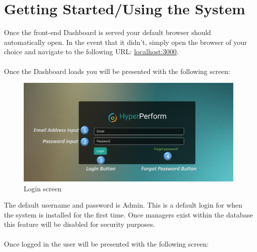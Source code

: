 \documentclass[11pt,a4paper]{article}
\begin{document}

%
%
\pagebreak
\section{Getting Started/Using the System}
Once the front-end Dashboard is served your default browser should automatically open. In the event that it didn't, simply open the browser of your choice and navigate to the following URL: \url{localhost:3000}. \\ \\
Once the Dashboard loads you will be presented with the following screen:

\begin{figure}[H]
	\begin{center}
		\includegraphics[scale=0.3]{../Images/Getting_Started/Login_numbered}
		\caption{Login screen}
	\end{center}
\end{figure}
\noindent
The default username and password is Admin. This is a default login for when the system is installed for the first time. Once managers exist within the database this feature will be disabled for security purposes. \\ \\
Once logged in the user will be presented with the following screen:
\end{document}
